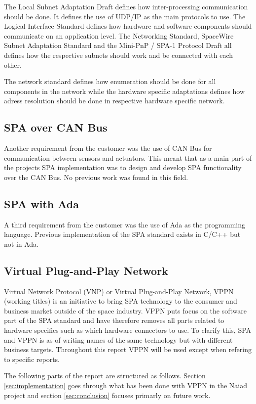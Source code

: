 The Local Subnet Adaptation Draft defines how inter-processing communication
should be done. It defines the use of UDP/IP as the main protocols to use. The
Logical Interface Standard defines how hardware and software components should
communicate on an application level. The Networking Standard, SpaceWire Subnet
Adaptation Standard and the Mini-PnP / SPA-1 Protocol Draft all defines how the
respective subnets should work and be connected with each other.

The network
standard defines how enumeration should be done for all components in
the network while the hardware specific adaptations defines how adress
resolution should be done in respective hardware specific network.

\subsection{SPA over CAN Bus}
Another requirement from the customer was the use of CAN Bus
\cite{standard:can_bus} for communication between sensors and actuators.
This meant that as a main part of the projects
SPA implementation was to design and develop SPA functionality over the CAN
Bus. No previous work was found in this field.

\subsection{SPA with Ada}
A third requirement from the customer was the use of Ada as the programming
language. Previous implementation of the SPA standard exists in C/C++ but not
in Ada.

\subsection{Virtual Plug-and-Play Network}
Virtual Network Protocol (VNP) \cite{web:vnp} or Virtual Plug-and-Play
Network, VPPN (working titles) is an initiative to bring SPA technology to
the consumer and business market outside of the space industry. VPPN puts focus
on the software part of the SPA standard and have therefore removes all parts
related to hardware specifics such as which hardware connectors to use. To
clarify this, SPA and VPPN is as of writing names of the same technology but
with different business targets. Throughout this report VPPN will be used
except when refering to specific reports.

The following parts of the report are structured as follows. Section \ref{sec:implementation}
goes through what has been done with VPPN in the Naiad project and section
\ref{sec:conclusion} focuses primarly on future work.
